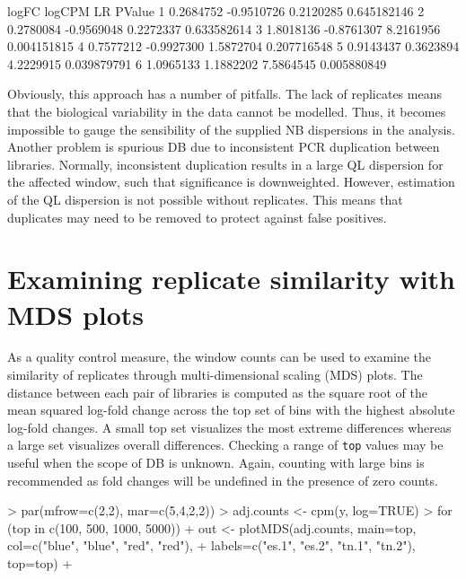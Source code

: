 \documentclass[12pt]{report}
\renewenvironment{Schunk}{\vspace{0pt}}{\vspace{0pt}}
\newcommand{\code}[1]{{\small\texttt{#1}}}
\begin{document}
\begin{Schunk}
\begin{Soutput}
      logFC     logCPM        LR      PValue
1 0.2684752 -0.9510726 0.2120285 0.645182146
2 0.2780084 -0.9569048 0.2272337 0.633582614
3 1.8018136 -0.8761307 8.2161956 0.004151815
4 0.7577212 -0.9927300 1.5872704 0.207716548
5 0.9143437  0.3623894 4.2229915 0.039879791
6 1.0965133  1.1882202 7.5864545 0.005880849
\end{Soutput}
\end{Schunk}

Obviously, this approach has a number of pitfalls. 
The lack of replicates means that the biological variability in the data cannot be modelled.
Thus, it becomes impossible to gauge the sensibility of the supplied NB dispersions in the analysis.
Another problem is spurious DB due to inconsistent PCR duplication between libraries.
Normally, inconsistent duplication results in a large QL dispersion for the affected window, such that significance is downweighted.
However, estimation of the QL dispersion is not possible without replicates.
This means that duplicates may need to be removed to protect against false positives.

\section{Examining replicate similarity with MDS plots}
As a quality control measure, the window counts can be used to examine the similarity of replicates through multi-dimensional scaling (MDS) plots. 
The distance between each pair of libraries is computed as the square root of the mean squared log-fold change across the top set of bins with the highest absolute log-fold changes.
A small top set visualizes the most extreme differences whereas a large set visualizes overall differences.
Checking a range of \code{top} values may be useful when the scope of DB is unknown.
Again, counting with large bins is recommended as fold changes will be undefined in the presence of zero counts.

\begin{Schunk}
\begin{Sinput}
> par(mfrow=c(2,2), mar=c(5,4,2,2))
> adj.counts <- cpm(y, log=TRUE)
> for (top in c(100, 500, 1000, 5000)) {
+     out <- plotMDS(adj.counts, main=top, col=c("blue", "blue", "red", "red"),
+         labels=c("es.1", "es.2", "tn.1", "tn.2"), top=top)
+ }
\end{Sinput}
\end{Schunk}
\end{document}
